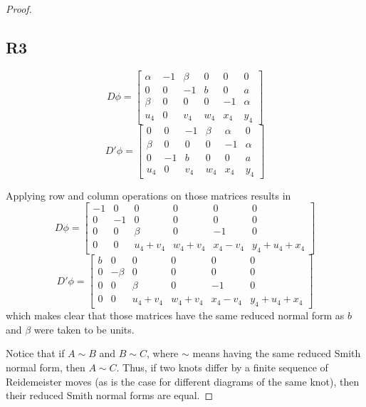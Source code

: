 \begin{proof}
  \subsection*{\centering R3}

  $$D\phi=
  \begin{bmatrix}
    \alpha & -1 & \beta & 0 & 0 & 0 \\ 
    0 & 0 & -1 & b & 0 & a \\ 
    \beta & 0 & 0 & 0 & -1 & \alpha \\ 
    u_4 & 0 & v_4 & w_4 & x_4 & y_4
  \end{bmatrix}
  $$
  $$D'\phi=
  \begin{bmatrix}
    0 & 0 & -1 & \beta & \alpha & 0 \\ 
    \beta & 0 & 0 & 0 & -1 & \alpha \\ 
    0 & -1 & b & 0 & 0 & a\\ 
    u_4 & 0 & v_4 & w_4 & x_4 & y_4
  \end{bmatrix}
  $$

  Applying row and column operations on those matrices results in 
  $$
  D\phi=
  \begin{bmatrix}
    -1 & 0 & 0 & 0 & 0 & 0 \\
    0 & -1 & 0 & 0 & 0 & 0 \\ 
    0 & 0 & \beta & 0 & -1 & 0 \\ 
    0 & 0 & u_4+v_4 & w_4+v_4 & x_4-v_4 & y_4+u_4+x_4
  \end{bmatrix}
  $$
  $$
  D'\phi=
  \begin{bmatrix}
    b & 0 & 0 & 0 & 0 & 0 \\
    0 & -\beta & 0 & 0 & 0 & 0 \\ 
    0 & 0 & \beta & 0 & -1 & 0 \\ 
    0 & 0 & u_4+v_4 & w_4+v_4 & x_4-v_4 & y_4+u_4+x_4
  \end{bmatrix}
  $$
  which makes clear that those matrices have the same reduced normal form as $b$ and $\beta$ were taken to be units.

  Notice that if $A\sim B$ and $B\sim C$, where $\sim$ means having the same reduced Smith normal form, then $A\sim C$. Thus, if two knots differ by a finite sequence of Reidemeister moves (as is the case for different diagrams of the same knot), then their reduced Smith normal forms are equal.

\end{proof}
